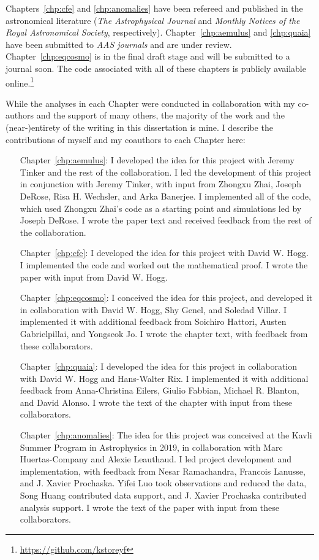 Chapters~\ref{chp:cfe} and \ref{chp:anomalies} have been refereed and published in the astronomical literature (\emph{The Astrophysical Journal} and \emph{Monthly Notices of the Royal Astronomical Society}, respectively).
Chapter~\ref{chp:aemulus} and \ref{chp:quaia} have been submitted to \emph{AAS journals} and are under review.
Chapter~\ref{chp:eqcosmo} is in the final draft stage and will be submitted to a journal soon.
The code associated with all of these chapters is publicly available online.\footnote{\url{https://github.com/kstoreyf}}

While the analyses in each Chapter were conducted in collaboration with my co-authors and the support of many others, the majority of the work and the (near-)entirety of the writing in this dissertation is mine. 
I describe the contributions of myself and my coauthors to each Chapter here:
\begin{enumerate}[leftmargin=4\parindent]
    \item[Chapter~\ref{chp:aemulus}:] I developed the idea for this project with Jeremy Tinker and the rest of the \aemulus collaboration. I led the development of this project in conjunction with Jeremy Tinker, with input from Zhongxu Zhai, Joseph DeRose, Risa H. Wechsler, and Arka Banerjee. I implemented all of the code, which used Zhongxu Zhai's code as a starting point and simulations led by Joseph DeRose. I wrote the paper text and received feedback from the rest of the collaboration.
    \item[Chapter~\ref{chp:cfe}:] I developed the idea for this project with David W. Hogg. I implemented the code and worked out the mathematical proof. I wrote the paper with input from David W. Hogg.
    \item[Chapter~\ref{chp:eqcosmo}:] I conceived the idea for this project, and developed it in collaboration with David W. Hogg, Shy Genel, and Soledad Villar. I implemented it with additional feedback from Soichiro Hattori, Austen Gabrielpillai, and Yongseok Jo. I wrote the chapter text, with feedback from these collaborators.
    \item[Chapter~\ref{chp:quaia}:] I developed the idea for this project in collaboration with David W. Hogg and Hans-Walter Rix. I implemented it with additional feedback from Anna-Christina Eilers, Giulio Fabbian, Michael R. Blanton, and David Alonso. I wrote the text of the chapter with input from these collaborators.
    \item[Chapter~\ref{chp:anomalies}:] The idea for this project was conceived at the Kavli Summer Program in Astrophysics in 2019, in collaboration with Marc Huertas-Company and Alexie Leauthaud. I led project development and implementation, with feedback from Nesar Ramachandra, Francois Lanusse, and J. Xavier Prochaska. Yifei Luo took observations and reduced the data, Song Huang contributed data support, and J. Xavier Prochaska contributed analysis support. I wrote the text of the paper with input from these collaborators.
\end{enumerate}


